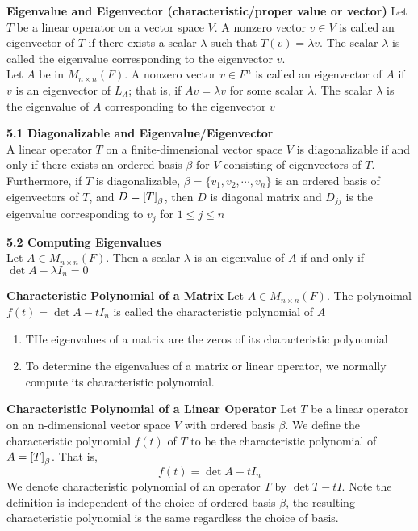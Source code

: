 \documentclass[11pt]{article}
\begin{document}
\begin{defn*}
    \textbf{Eigenvalue and Eigenvector (characteristic/proper value or vector)} Let $T$ be a linear operator on a vector space $V$. A nonzero vector $v\in V$ is called an eigenvector of $T$ if there exists a scalar $\lambda$ such that $T(v) = \lambda v$. The scalar $\lambda$ is called the eigenvalue corresponding to the eigenvector $v$. \\
    Let $A$ be in $M_{n\times n}(F)$. A nonzero vector $v\in F^n$ is called an eigenvector of $A$ if $v$ is an eigenvector of $L_A$; that is, if $Av = \lambda v$ for some scalar $\lambda$. The scalar $\lambda$ is the eigenvalue of $A$ corresponding to the eigenvector $v$
\end{defn*}

\begin{theorem*}
    \textbf{5.1 Diagonalizable and Eigenvalue/Eigenvector}\\
     A linear operator $T$ on a finite-dimensional vector space $V$ is diagonalizable if and only if there exists an ordered basis $\beta$ for $V$ consisting of eigenvectors of $T$. Furthermore, if $T$ is diagonalizable, $\beta = \{v_1,v_2,\cdots, v_n\}$ is an ordered basis of eigenvectors of $T$, and $D = \left[ T \right]_{\beta}$, then $D$ is diagonal matrix and $D_{jj}$ is the eigenvalue corresponding to $v_j$ for $1\leq j \leq n$
\end{theorem*}


\begin{theorem*}
    \textbf{5.2 Computing Eigenvalues} \\ 
    Let $A\in M_{n\times n}(F)$. Then a scalar $\lambda$ is an eigenvalue of $A$ if and only if $\det{A-\lambda I_n} =0$
\end{theorem*}


\begin{defn*}
    \textbf{Characteristic Polynomial of a Matrix} Let $A\in M_{n\times n}(F)$. The polynoimal $f(t) = \det{A - tI_n}$ is called the characteristic polynomial of $A$
    \begin{enumerate}
        \item THe eigenvalues of a matrix are the zeros of its characteristic polynomial 
        \item To determine the eigenvalues of a matrix or linear operator, we normally compute its characteristic polynomial.
    \end{enumerate}
\end{defn*}


\begin{defn*}
    \textbf{Characteristic Polynomial of a Linear Operator} Let $T$ be a linear operator on an n-dimensional vector space $V$ with ordered basis $\beta$. We define the characteristic polynomial $f(t)$ of $T$ to be the characteristic polynomial of $A = \left[ T \right]_{\beta}$. That is,
    \[  
        f(t) = \det{A - tI_n}    
    \]
    We denote characteristic polynomial of an operator $T$ by $\det{T - tI}$. Note the definition is independent of the choice of ordered basis $\beta$, the resulting characteristic polynomial is the same regardless the choice of basis.
\end{defn*}
\end{document}
